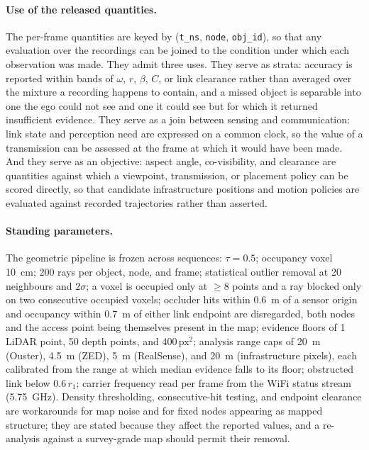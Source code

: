\paragraph{Use of the released quantities.}
The per-frame quantities are keyed by (\texttt{t\_ns}, \texttt{node},
\texttt{obj\_id}), so that any evaluation over the recordings can be joined to
the condition under which each observation was made. They admit three uses.
They serve as strata: accuracy is reported within bands of $\omega$, $r$,
$\beta$, $C$, or link clearance rather than averaged over the mixture a
recording happens to contain, and a missed object is separable into one the ego
could not see and one it could see but for which it returned insufficient
evidence. They serve as a join between sensing and communication: link state
and perception need are expressed on a common clock, so the value of a
transmission can be assessed at the frame at which it would have been made.
And they serve as an objective: aspect angle, co-visibility, and clearance are
quantities against which a viewpoint, transmission, or placement policy can be
scored directly, so that candidate infrastructure positions and motion policies
are evaluated against recorded trajectories rather than asserted.

\paragraph{Standing parameters.}
The geometric pipeline is frozen across sequences: $\tau = 0.5$; occupancy voxel
\SI{10}{\centi\metre}; 200 rays per object, node, and frame; statistical outlier
removal at 20 neighbours and $2\sigma$; a voxel is occupied only at $\ge 8$
points and a ray blocked only on two consecutive occupied voxels; occluder hits
within \SI{0.6}{\metre} of a sensor origin and occupancy within \SI{0.7}{\metre}
of either link endpoint are disregarded, both nodes and the access point being
themselves present in the map; evidence floors of 1 LiDAR point, 50 depth
points, and 400\,px$^2$; analysis range caps of \SI{20}{\metre} (Ouster),
\SI{4.5}{\metre} (ZED), \SI{5}{\metre} (RealSense), and \SI{20}{\metre}
(infrastructure pixels), each calibrated from the range at which median evidence
falls to its floor; obstructed link below $0.6\,r_1$; carrier frequency read per
frame from the WiFi status stream (\SI{5.75}{\giga\hertz}). Density
thresholding, consecutive-hit testing, and endpoint clearance are workarounds
for map noise and for fixed nodes appearing as mapped structure; they are stated
because they affect the reported values, and a re-analysis against a
survey-grade map should permit their removal.

